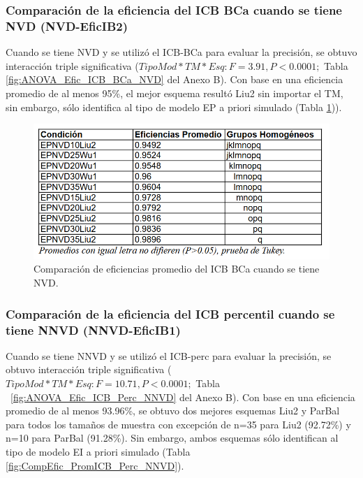 \subsubsection{Comparación de la eficiencia del ICB BCa cuando se tiene NVD (NVD-EficIB2)}

Cuando se tiene NVD y se utilizó el ICB-BCa para evaluar la precisión, se obtuvo interacción triple significativa ($TipoMod*TM*Esq: F=3.91, P<0.0001;$ Tabla \ref{fig:ANOVA_Efic_ICB_BCa_NVD} del Anexo B). Con base en una eficiencia promedio de al menos 95\%, el mejor esquema resultó Liu2 sin importar el TM, sin embargo, sólo identifica al tipo de modelo EP a priori simulado (Tabla \ref{fig:CompEfic_PromICB_BCa_NVD})).\\

\begin{figure}[ht] 
	\centering 
	\includegraphics[width=0.76\linewidth]{img/CompEfic_PromICB_BCa_NVD.png} 
	\caption{Comparación de eficiencias promedio del ICB BCa cuando se tiene NVD.} 
	\label{fig:CompEfic_PromICB_BCa_NVD}
\end{figure}
\FloatBarrier



\subsubsection{Comparación de la eficiencia del ICB percentil cuando se tiene NNVD (NNVD-EficIB1)}

Cuando se tiene NNVD y se utilizó el ICB-perc para evaluar la precisión, se obtuvo interacción triple significativa ($TipoMod*TM*Esq: F=10.71, P<0.0001;$ Tabla ~\ref{fig:ANOVA_Efic_ICB_Perc_NNVD} del Anexo B). Con base en una eficiencia promedio de al menos 93.96\%, se obtuvo dos mejores esquemas Liu2 y ParBal para todos los tamaños de muestra con excepción de n=35 para Liu2 (92.72\%) y n=10 para ParBal (91.28\%). Sin embargo, ambos esquemas sólo identifican al tipo de modelo EI a priori simulado (Tabla \ref{fig:CompEfic_PromICB_Perc_NNVD}).

